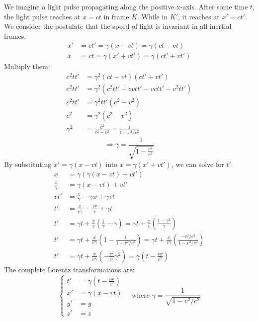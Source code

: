 \documentclass{article}
\begin{document}
	We imagine a light pulse propagating along the positive x-axis. After some time $t$, the light pulse reaches at $x=ct$ in frame $K$. While in $K'$, it reaches at $x'=ct'$.
	We consider the postulate that the speed of light is invariant in all inertial frames.
	\begin{align*}
		x' &= ct' = \gamma(x-vt) = \gamma(ct-vt) \\
		x &= ct = \gamma(x'+vt') = \gamma(ct'+vt')
	\end{align*}
	Multiply them:
	\begin{align*}
		c^2 t t' &= \gamma^2(ct-vt)(ct'+vt') \\
		c^2 t t' &= \gamma^2 (c^2 tt' + cvtt' - vctt' - v^2tt') \\
		c^2 t t' &= \gamma^2 t t' (c^2 - v^2) \\
		c^2 &= \gamma^2(c^2 - v^2) \\
		\gamma^2 &= \frac{c^2}{c^2-v^2} = \frac{1}{1-v^2/c^2}
	\end{align*}
	\begin{equation}
		\Rightarrow \gamma = \frac{1}{\sqrt{1-\frac{v^2}{c^2}}}
	\end{equation}
	By substituting $x' = \gamma(x-vt)$ into $x = \gamma(x'+vt')$, we can solve for $t'$.
	\begin{align*}
		x &= \gamma(\gamma(x-vt) + vt') \\
		\frac{x}{\gamma} &= \gamma(x-vt) + vt' \\
		vt' &= \frac{x}{\gamma} - \gamma x + \gamma vt \\
		t' &= \frac{x}{v\gamma} - \frac{\gamma x}{v} + \gamma t \\
		t' &= \gamma t + \frac{x}{v} (\frac{1}{\gamma} - \gamma) = \gamma t + \frac{x}{v} \left( \frac{1-\gamma^2}{\gamma} \right) \\
		t' &= \gamma t + \frac{x}{v\gamma} \left(1 - \frac{1}{1-v^2/c^2}\right) = \gamma t + \frac{x}{v\gamma} \left(\frac{-v^2/c^2}{1-v^2/c^2}\right) \\
		t' &= \gamma t + \frac{x}{v\gamma} (-\frac{v^2}{c^2} \gamma^2) = \gamma \left(t - \frac{vx}{c^2}\right)
	\end{align*}
	The complete Lorentz transformations are:
	\begin{equation}
		\left\{
		\begin{aligned}
			t' &= \gamma\left(t-\frac{vx}{c^2}\right) \\
			x' &= \gamma(x-vt) \\
			y' &= y \\
			z' &= z
		\end{aligned}
		\right.
		\quad \text{where } \gamma = \frac{1}{\sqrt{1-v^2/c^2}}
	\end{equation}
	
\end{document}
